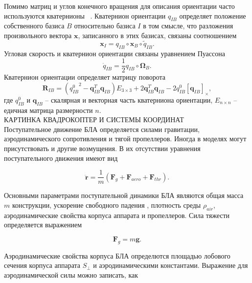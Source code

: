 \documentclass[a4paper,14pt,oneside,openany]{memoir}
\begin{document}
	
	 Помимо матриц и углов конечного вращения для описания ориентации часто используются кватернионы ~\cite{Amelkin01}. Кватернион ориентации  $q_{IB}$ определяет положение собственного базиса {$B$} относительно базиса {$I$} в том смысле, что разложения произвольного вектора $\bm{x}$, записанного в этих базисах, связаны соотношением
 	\begin{equation} \label{eq:quat}
 	\bm{x}_I = q_{IB} \circ \bm{x}_B \circ \tilde{q}_{IB}.
 	\end{equation}
 	Угловая скорость и кватернион ориентации связаны уравнением Пуассона
 	\begin{equation} \label{eq:puasson}
 	\dot{q}_{IB} = \frac{1}{2} {q}_{IB} \circ \bm{\Omega}_B.
 	\end{equation}
 	Кватернион ориентации определяет матрицу поворота
 	\begin{equation} \label{eq:quat_to_rotmx}
 	\bm{R}_{IB} = ({q_{IB}^0}^2 - \bm{q}_{IB}^T \bm{q}_{IB}) E_{3 \times 3} + 2 \bm{q}_{IB}^T \bm{q}_{IB} - 2 {q_{IB}^0} [\bm{q}_{IB}]_{\times},
 	\end{equation}
 	где $q_{IB}^0$ и $\bm{q}_{IB}$ -- скалярная и векторная часть кватерниона ориентации, $E_{n \times n}$ -- едичная матрица размерности $n$.
	\\
	КАРТИНКА КВАДРОКОПТЕР И СИСТЕМЫ КООРДИНАТ
	\\
	Поступательное движение БЛА определяется силами гравитации, аэродинамического сопротивления и тягой пропеллеров. Иногда в моделях могут присутствовать и другие возмущения. В их отсутствии уравнения поступательного движения имеют вид
	
	\begin{equation} \label{eq:common_traslational_motion}
	\ddot{\bm{r}} = \frac{1}{m}(\bm{F}_g + \bm{F}_{aero} + \bm{F}_{thr}).
	\end{equation}
	
	Основными параметрами поступательной динамики БЛА являются общая масса {$m$} конструкции, ускорение свободного падения , плотность среды {$\rho_{air}$}, аэродинамические свойства корпуса аппарата и пропеллеров. Сила тяжести определяется выражением
	
	\begin{equation} \label{eq:gravity_force}
	\bm{F}_g = m\bm{g}.
	\end{equation}
	
	Аэродинамические свойства корпуса БЛА определются площадью лобового сечения корпуса аппарата {$S_{\perp}$} и аэродинамическими константами. Выражение для аэродинамической силы можно записать, как
	 
\end{document}
